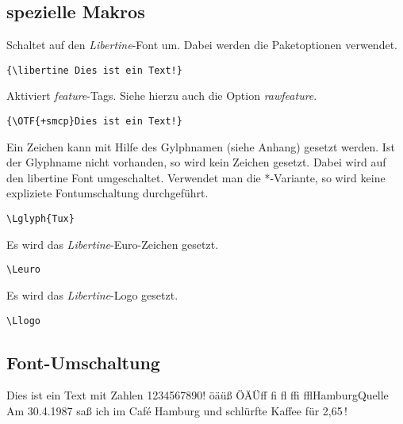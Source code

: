 \documentclass{fontdoku}
\def\TEXT{%
Dies ist ein Text mit Zahlen 1234567890!\newline%
öäüß ÖÄÜ\Lglyph{Germandbls}\quad ff fi fl ffi ffl\quad Hamburg\quad Quelle\newline%
Am 30.4.1987 saß ich im \glqq{}Caf\'e Hamburg\grqq{} und schlürfte Kaffee für 2,65\,\Leuro!
}
\begin{document}
\newpage
\subsection{spezielle Makros}

\begin{description}[\setleftmargin{1em}\breaklabel]
\item [\textbackslash libertine]%
      Schaltet auf den \emph{Libertine}-Font um. Dabei werden die Paketoptionen verwendet.
\begin{lstlisting}
{\libertine Dies ist ein Text!}
\end{lstlisting}

\item [\textbackslash OTF]%
      Aktiviert \emph{feature}-Tags. Siehe hierzu auch die Option \emph{rawfeature}.
\begin{lstlisting}
{\OTF{+smcp}Dies ist ein Text!}
\end{lstlisting}

\item [\textbackslash Lglyph]%
      Ein Zeichen kann mit Hilfe des Gylphnamen (siehe Anhang) gesetzt werden. Ist der Glyphname
      nicht vorhanden, so wird kein Zeichen gesetzt. Dabei wird auf den libertine Font umgeschaltet. Verwendet man die *-Variante, so wird keine expliziete Fontumschaltung durchgeführt.
\begin{lstlisting}
\Lglyph{Tux}
\end{lstlisting}

\item [\textbackslash Leuro]%
      Es wird das \emph{Libertine}-Euro-Zeichen gesetzt.
\begin{lstlisting}
\Leuro
\end{lstlisting}

\item [\textbackslash Llogo]%
      Es wird das \emph{Libertine}-Logo gesetzt.
\begin{lstlisting}
\Llogo
\end{lstlisting}
\end{description}

\newpage
\subsection{Font-Umschaltung}

\begin{lstsample}[hpos=l,lstsize=0.4,codesize=0.4,toprule,bottomrule]
\libertine\TEXT
\end{lstsample}
\end{document}
